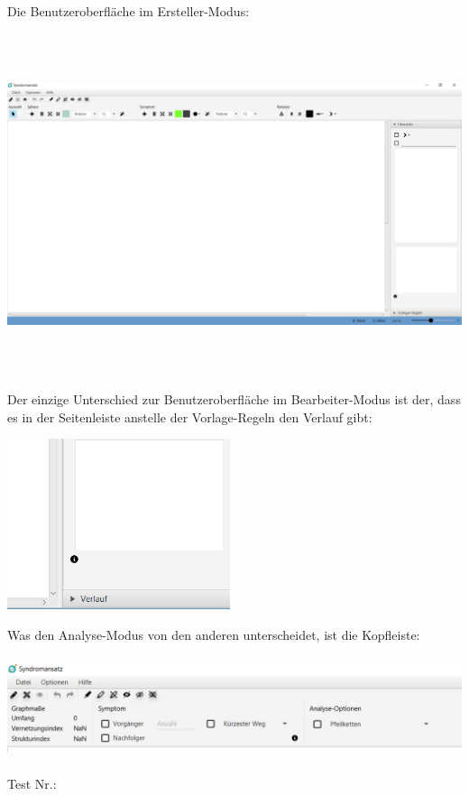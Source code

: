 \documentclass[enabledeprecatedfontcommands]{scrartcl}
\begin{document}
Die Benutzeroberfläche im Ersteller-Modus:
\begin{center}
	\includegraphics[height=10cm, angle = 90]{erstellerModus.PNG}
\end{center}
\newpage
Der einzige Unterschied zur Benutzeroberfläche im Bearbeiter-Modus ist der, dass es in der Seitenleiste anstelle der Vorlage-Regeln den Verlauf gibt:
\begin{center}
	\includegraphics[height=5cm]{bearbeiterModus.PNG}
\end{center}
Was den Analyse-Modus von den anderen unterscheidet, ist die Kopfleiste:
\begin{center}
	\includegraphics[height=3cm]{analyseModus.PNG}
\end{center}

\hfill Test Nr.: \setlength{\fboxsep}{1pt} %
\end{document}
